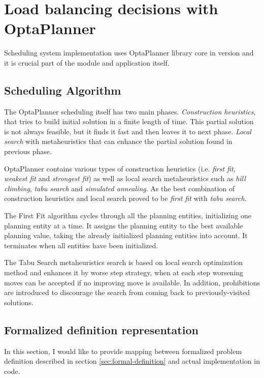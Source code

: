 \section{Load balancing decisions with OptaPlanner}\label{sec:load-balancing-optaplanner}

Scheduling system implementation uses OptaPlanner library core in version \cite{optaplannerDoc}
and it is crucial part of the  module and application itself.

\subsection{Scheduling Algorithm}
The OptaPlanner scheduling itself has two main phases.
\textit{Construction heuristics}, that tries to build initial solution in a finite length of time.
This partial solution is not always feasible, 
but it finds it fast and then leaves it to next phase.
\textit{Local search} with metaheuristics that can enhance the partial solution found in previous phase.

OptaPlanner contains various types of construction heuristics (i.e. \textit{first fit}, \textit{weakest fit} and \textit{strongest fit})
as well as local search metaheuristics such as \textit{hill climbing}, \textit{tabu search} and \textit{simulated annealing}.
As the best combination of construction heuristics and local search proved to be \textit{first fit} with \textit{tabu search}.

The First Fit algorithm cycles through all the planning entities,
initializing one planning entity at a time. 
It assigns the planning entity to the best available planning value, 
taking the already initialized planning entities into account.
It terminates when all entities have been initialized\cite{optaplannerDoc:heuristics}.

The Tabu Search metaheuristics search is based on local search optimization method
and enhances it by worse step strategy, 
when at each step worsening moves can be accepted if no improving move is available.
In addition, prohibitions are introduced to discourage the search from coming back to previously-visited solutions\cite{glover1989tabu}.

\subsection{Formalized definition representation}\label{subsec:formalized-definition-representation}
In this section,
I would like to provide mapping between formalized problem definition described in section \ref{sec:formal-definition}
and actual implementation in code.

